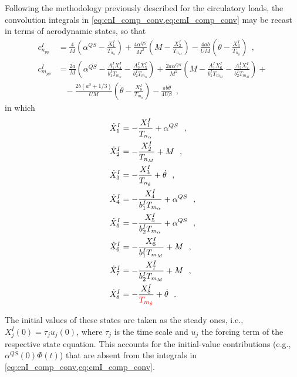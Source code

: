 \documentclass[12pt,a4paper,oneside,english]{abntex2} %
\newcommand{\fix}[1]{{\color{red}#1}}
\def\lp{\left(}
\def\rp{\right)}
\def\thetadot{\dot{\theta}}
\begin{document}
Following the methodology previously described for the circulatory loads, the convolution integrals in \cref{eq:cnI_comp_conv,eq:cmI_comp_conv} may be recast in terms of aerodynamic states, so that
\begin{align}
    c_{n_{pp}}^I &= \frac{4}{M}\lp\alpha^{QS}-\frac{X_1^I}{T_{n_\alpha}}\rp + \frac{4\alpha^{QS}}{M^2}\lp M-\frac{X_2^I}{T_{n_M}}\rp - \frac{4ab}{UM}\lp\thetadot-\frac{X_3^I}{T_{n_{\thetadot}}}\rp \ \ ,
    \label{eq:cnI_comp}
    \\
    c_{m_{pp}}^I &= \frac{2a}{M}\lp\alpha^{QS}-\frac{A_1^IX_4^I}{b_1^IT_{m_\alpha}}-\frac{A_2^IX_5^I}{b_2^IT_{m_\alpha}}\rp + \frac{2a\alpha^{QS}}{M^2}\lp M-\frac{A_1^IX_6^I}{b_1^IT_{m_M}}-\frac{A_2^IX_7^I}{b_2^IT_{m_M}}\rp + \nonumber 
    \\
    & \;\;\; -\frac{2b\lp a^2+1/3\rp}{UM}\lp\thetadot-\frac{X_8^I}{T_{m_{\thetadot}}}\rp - \frac{\pi b\thetadot}{4U\beta} \ \ ,
    \label{eq:cmI_comp}
\end{align}
in which
\begin{align}
    \dot{X}_1^I &= -\frac{X_1^I}{T_{n_\alpha}} + \alpha^{QS} \ \ ,
    \label{eq:xdot1_cnI_comp}
    \\
    \dot{X}_2^I &= -\frac{X_2^I}{T_{n_M}} + M \ \ ,
    \label{eq:xdot2_cnI_comp}
    \\
    \dot{X}_3^I &= -\frac{X_3^I}{T_{n_{\thetadot}}} + \thetadot \ \ ,
    \label{eq:xdot3_cnI_comp}
    \\
    \dot{X}_4^I &= -\frac{X_4^I}{b_1^IT_{m_\alpha}} + \alpha^{QS} \ \ ,
    \label{eq:xdot1_cmI_comp}
    \\
    \dot{X}_5^I &= -\frac{X_5^I}{b_2^IT_{m_\alpha}} + \alpha^{QS} \ \ ,
    \label{eq:xdot2_cmI_comp}
    \\
    \dot{X}_6^I &= -\frac{X_6^I}{b_1^IT_{m_M}} + M
    \ \ , \label{eq:xdot3_cmI_comp}
    \\
    \dot{X}_7^I &= -\frac{X_7^I}{b_2^IT_{m_M}} + M
    \ \ , \label{eq:xdot4_cmI_comp}
    \\
    \dot{X}_8^I &= -\frac{X_8^I}{\fix{T_{m_{\thetadot}}}} + \thetadot \ \ .
    \label{eq:xdot5_cmI_comp}
\end{align}

\fix{The initial values of these states are taken as the steady ones, i.e., $X_j^I(0)=\tau_j u_j(0)$, where $\tau_j$ is the time scale and $u_j$ the forcing term of the respective state equation. This accounts for the initial-value contributions (e.g., $\alpha^{QS}(0)\Phi(t)$) that are absent from the integrals in \cref{eq:cnI_comp_conv,eq:cmI_comp_conv}.}
\end{document}
